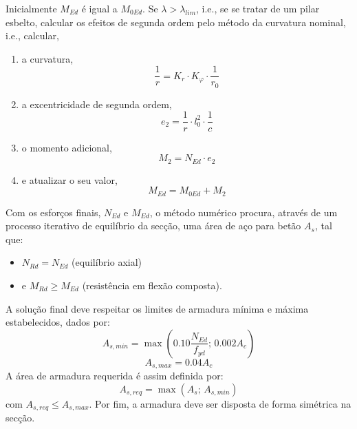 Inicialmente $M_{Ed}$ é igual a $M_{0Ed}$.
Se $\lambda > \lambda_{lim}$, i.e., se se tratar de um pilar esbelto, calcular os efeitos de segunda ordem pelo método da curvatura nominal, i.e., calcular,
\begin{enumerate}
    \item a curvatura,
    \begin{equation}
        \frac{1}{r} = K_r \cdot K_{\varphi} \cdot \frac{1}{r_0}
    \end{equation}
    \item a excentricidade de segunda ordem,
    \begin{equation}
        e_2 = \frac{1}{r} \cdot l_0^2 \cdot \frac{1}{c}
    \end{equation}
    \item o momento adicional,
    \begin{equation}
        M_2 = N_{Ed} \cdot e_2
    \end{equation}
    \item e atualizar  o seu valor,
    \begin{equation}
        M_{Ed} = M_{0Ed} + M_2
    \end{equation}
\end{enumerate}

Com os esforços finais, $N_{Ed}$ e $M_{Ed}$, o método numérico procura, através de um processo iterativo de equilíbrio da secção, uma área de aço para betão $A_s$, tal que:
\begin{itemize}
    \item $N_{Rd} = N_{Ed}$ (equilíbrio axial)
    \item e $M_{Rd} \ge M_{Ed}$ (resistência em flexão composta).
\end{itemize}

A solução final deve respeitar os limites de armadura mínima e máxima estabelecidos, dados por:
\begin{equation}
    A_{s,min} = \max\left(0.10 \frac{N_{Ed}}{f_{yd}};\, 0.002 A_c\right)
\end{equation}
\begin{equation}
    A_{s,max} = 0.04 A_c
\end{equation}
A área de armadura requerida é assim definida por:
\begin{equation}
    A_{s,req} = \max(A_s;\, A_{s,min})
\end{equation}
com $A_{s,req} \le A_{s,max}$. Por fim, a armadura deve ser disposta de forma simétrica na secção.

